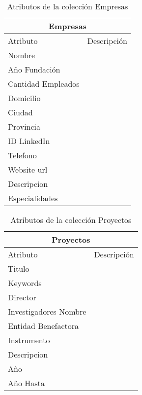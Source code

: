 \begin{center}
\begin{table}[H]
\centering
\begin{tabular}{| l | l |}
\hline
\multicolumn{2}{|c|}{Empresas} \\ \hline
Atributo & Descripción \\ \hline
Nombre & \\ \hline 
Año Fundación & \\ \hline 
Cantidad Empleados & \\ \hline 
Domicilio & \\ \hline 
Ciudad & \\ \hline 
Provincia & \\ \hline 
ID LinkedIn & \\ \hline 
Telefono & \\ \hline 
Website url & \\ \hline 
Descripcion & \\ \hline 
Especialidades & \\ \hline 
\end{tabular}
\caption{Atributos de la colección Empresas}
\label{table:empresas}
\end{table}
\end{center}

\begin{center}
\begin{table}[H]
\centering
\begin{tabular}{| l | l |}
\hline
\multicolumn{2}{|c|}{Proyectos} \\ \hline
Atributo & Descripción \\ \hline
Titulo & \\ \hline 
Keywords & \\ \hline 
Director & \\ \hline 
Investigadores Nombre & \\ \hline 
Entidad Benefactora & \\ \hline 
Instrumento & \\ \hline 
Descripcion & \\ \hline 
Año & \\ \hline 
Año Hasta & \\ \hline
\end{tabular}
\caption{Atributos de la colección Proyectos}
\label{table:proyectos}
\end{table}
\end{center}

